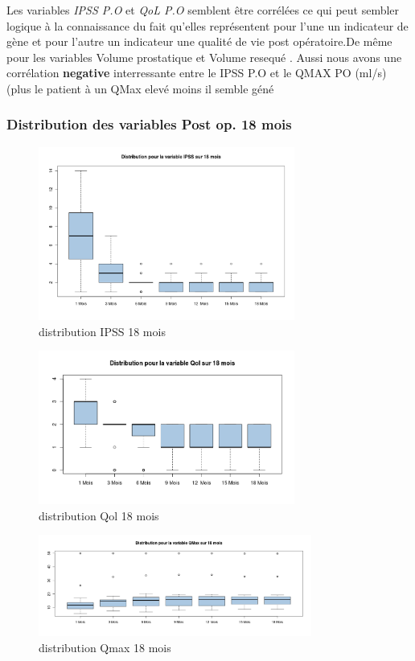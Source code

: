 Les variables  \emph{IPSS P.O} et   \emph{QoL P.O}  semblent être corrélées ce qui peut sembler logique à la connaissance du fait 
qu’elles représentent pour l’une un indicateur de gène et pour l’autre un indicateur une qualité de vie post opératoire.De même  pour les variables Volume prostatique et Volume resequé . Aussi nous avons une corrélation \textbf{negative} interressante entre le IPSS P.O et le QMAX PO (ml/s) (plus le patient à un QMax elevé moins il semble géné
\newpage 

\subsubsection{Distribution des variables Post op. 18 mois}

\begin{figure}[!h]
\centering
\includegraphics[width=0.75\textwidth]{../Fig/RTUPB//rtupb-boxplot-post-ipss}
\caption{distribution IPSS 18 mois}
\end{figure}


\begin{figure}[!h]
\centering
\includegraphics[width=0.75\textwidth]{../Fig/RTUPB//rtupb-boxplot-post-Qol}
\caption{distribution Qol 18 mois}
\end{figure}

\begin{figure}[!h]
\centering
\includegraphics[width=0.80\textwidth]{../Fig/RTUPB//rtupb-boxplot-post-Qmax}
\caption{distribution Qmax 18 mois}
\end{figure}






